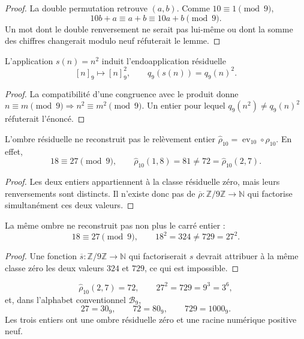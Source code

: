 \begin{proof}
La double permutation retrouve \((a,b)\). Comme \(10\equiv1\pmod9\),
\[
 10b+a\equiv a+b\equiv10a+b\pmod9.
\]
Un mot dont le double renversement ne serait pas lui-même ou dont la somme des chiffres
changerait modulo neuf réfuterait le lemme.
\end{proof}

\begin{lemma}
\label{int:pf84:SYN30-SQ-DESC}
L'application \(s(n)=n^2\) induit l'endoapplication résiduelle
\[
 [n]_9\longmapsto[n]_9^2,
 \qquad q_9(s(n))=q_9(n)^2.
\]
\end{lemma}

\begin{proof}
La compatibilité d'une congruence avec le produit donne
\(n\equiv m\pmod9\Rightarrow n^2\equiv m^2\pmod9\). Un entier pour lequel
\(q_9(n^2)\ne q_9(n)^2\) réfuterait l'énoncé.
\end{proof}

\begin{proposition}
\label{int:pf84:SYN30-RHO-NONFAITH}
L'ombre résiduelle ne reconstruit pas le relèvement entier
\(\widehat\rho_{10}=\operatorname{ev}_{10}\circ\rho_{10}\). En effet,
\[
 18\equiv27\pmod9,\qquad
 \widehat\rho_{10}(1,8)=81\ne72=\widehat\rho_{10}(2,7).
\]
\end{proposition}

\begin{proof}
Les deux entiers appartiennent à la classe résiduelle zéro, mais leurs renversements sont
distincts. Il n'existe donc pas de
\(\overline\rho:\mathbb Z/9\mathbb Z\to\mathbb N\) qui factorise
simultanément ces deux valeurs.
\end{proof}

\begin{proposition}
\label{int:pf84:SYN30-SQ-NONFAITH}
La même ombre ne reconstruit pas non plus le carré entier :
\[
 18\equiv27\pmod9,\qquad
 18^2=324\ne729=27^2.
\]
\end{proposition}

\begin{proof}
Une fonction \(\overline s:\mathbb Z/9\mathbb Z\to\mathbb N\) qui
factoriserait \(s\) devrait attribuer à la même classe zéro les deux valeurs
\(324\) et \(729\), ce qui est impossible.
\end{proof}

\begin{corollary}
\label{int:pf84:SYN30-CROSS-WITNESS}
\[
 \widehat\rho_{10}(2,7)=72,\qquad
 27^2=729=9^3=3^6,
\]
et, dans l'alphabet conventionnel \(\mathscr B_9\),
\[
 27=30_9,\qquad72=80_9,\qquad729=1000_9.
\]
Les trois entiers ont une ombre résiduelle zéro et une racine numérique positive neuf.
\end{corollary}

